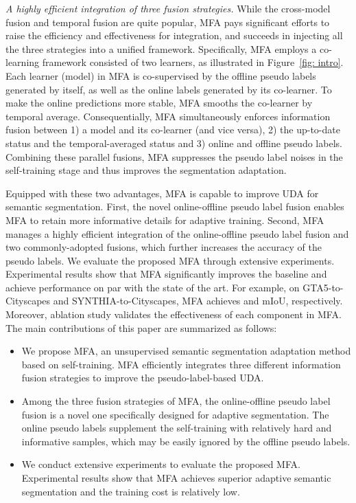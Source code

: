 \documentclass{bmvc2k}
\begin{document}
 \emph{A highly efficient integration of three fusion strategies.} While the cross-model fusion and temporal fusion are quite popular, MFA pays significant efforts to raise the efficiency and effectiveness for integration, and succeeds in injecting all the three strategies into a unified framework. Specifically, MFA employs a co-learning framework consisted of two learners, as illustrated in Figure~\ref{fig: intro}. Each learner (model) in MFA is co-supervised by the offline pseudo labels generated by itself, as well as the online labels generated by its co-learner. To make the online predictions more stable, MFA smooths the co-learner by temporal average. Consequentially, MFA simultaneously enforces information fusion between 1) a model and its co-learner (and vice versa), 2) the up-to-date status and the temporal-averaged status and 3) online and offline pseudo labels. Combining these parallel fusions, MFA suppresses the pseudo label noises in the self-training stage and thus improves the segmentation adaptation.

Equipped with these two advantages, MFA is capable to improve UDA for semantic segmentation. First, the novel online-offline pseudo label fusion enables MFA to retain more informative details for adaptive training. Second, MFA manages a highly efficient integration of the online-offline pseudo label fusion and two commonly-adopted fusions, which further increases the accuracy of the pseudo labels. We evaluate the proposed MFA through extensive experiments. Experimental results show that MFA significantly improves the baseline and achieve performance on par with the state of the art. For example, on GTA5-to-Cityscapes and SYNTHIA-to-Cityscapes, MFA achieves  and  mIoU, respectively. Moreover, ablation study validates the effectiveness of each component in MFA. The main contributions of this paper are summarized as follows:
 
\begin{itemize}
\vspace{-2pt}
\setlength{\itemsep}{0pt}
\setlength{\parsep}{0pt}
\setlength{\parskip}{0pt}
    \item We propose MFA, an unsupervised semantic segmentation adaptation method based on self-training. MFA efficiently integrates three different information fusion strategies to improve the pseudo-label-based UDA. 
    \item Among the three fusion strategies of MFA, the online-offline pseudo label fusion is a novel one specifically designed for adaptive segmentation. The online pseudo labels supplement the self-training with relatively hard and informative samples, which may be easily ignored by the offline pseudo labels. 
\item We conduct extensive experiments to evaluate the proposed MFA. Experimental results show that MFA achieves superior adaptive semantic segmentation and the training cost is relatively low. 


\end{itemize}
\end{document}
